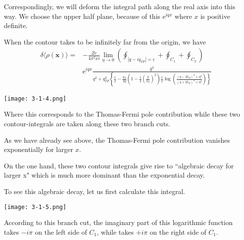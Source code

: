 \begin{itemize}
Correspondingly, we will deform the integral path along the real axis into this way. We choose the upper half plane, because of this $\mathrm{e}^{i q x}$ where $x$ is positive definite.

When the contour takes to be infinitely far from the origin, we have
\begin{equation} \label{Eqs3.1.32} \begin{split}
\delta \langle \rho(\mathbf{x}) \rangle =& -\frac{Z e}{4\pi^2 x i} \lim_{\eta \rightarrow 0} \left( \oint_{|q-i q_{TF}| = \epsilon} + \oint_{C_1} + \oint_{C_2} \right)\\
& \mathrm{e}^{i q x} \frac{q^3}{q^2 + q_{TF}^2 \left\{\frac{1}{2}-\frac{k_F}{2q}\left( 1-\frac{1}{4}(\frac{q}{k_F})^2 \right) \frac{1}{2} \log \left( \frac{(q-2 k_F)^2 + \eta^2}{(q + 2 k_F)^2 + \eta^2}\right) \right\}}
\end{split}\end{equation}

\begin{center} \label{Fig3.1.4}
\texttt{[image: 3-1-4.png]}
\end{center}

Where this corresponds to the Thomas-Fermi pole contribution while these two contour-integrals are taken along these two branch cuts.

As we have already see above, the Thomas-Fermi pole contribution vanishes exponentially for larger $x$.

On the one hand, these two contour integrals give rise to ``algebraic decay for larger x" which is much more dominant than the exponential decay.

To see this algebraic decay, let us first calculate this integral.
\begin{center} \label{Fig3.1.5}
\texttt{[image: 3-1-5.png]}
\end{center}

According to this branch cut, the imaginary part of this logarithmic function takes $-i \pi$ on the left side of $C_1$, while takes $+i \pi$ on the right side of $C_1$.


\end{itemize}
